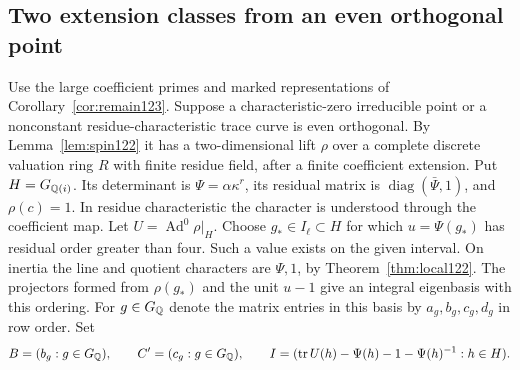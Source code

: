 \documentclass[a4paper,11pt]{article}
\theoremstyle{definition}
\theoremstyle{remark}
\numberwithin{equation}{section}
\begin{document}
\subsection{Two extension classes from an even orthogonal point}\label{nav:III-68}
Use the large coefficient primes and marked representations
of Corollary~\ref{cor:remain123}. Suppose a characteristic-zero
irreducible point or a nonconstant residue-characteristic trace
curve is even orthogonal. By Lemma~\ref{lem:spin122} it has a
two-dimensional lift \(\rho\) over a complete discrete
valuation ring \(R\) with finite residue field, after a finite
coefficient extension. Put \(H=G_{\mathbb Q(i)}\). Its determinant
is \(\Psi=\alpha\kappa^r\), its residual matrix is
\(\operatorname{diag}(\bar\Psi,1)\), and \(\rho(c)=1\).
In residue characteristic the character is understood through
the coefficient map. Let \(U=\operatorname{Ad}^0\rho|_H\).
Choose \(g_*\in I_\ell\subset H\) for which
\(u=\Psi(g_*)\) has residual order greater than four. Such
a value exists on the given interval. On inertia the line and
quotient characters are \(\Psi,1\), by
Theorem~\ref{thm:local122}. The projectors formed from
\(\rho(g_*)\) and the unit \(u-1\) give an integral eigenbasis
with this ordering. For \(g\in G_\mathbb Q\) denote the matrix entries
in this basis by \(a_g,b_g,c_g,d_g\) in row order. Set
\[
 B=(b_g:g\in G_\mathbb Q),\qquad C'=(c_g:g\in G_\mathbb Q),\qquad
 I=(\operatorname{tr}U(h)-\Psi(h)-1-\Psi(h)^{-1}:h\in H).
\]
\end{document}
